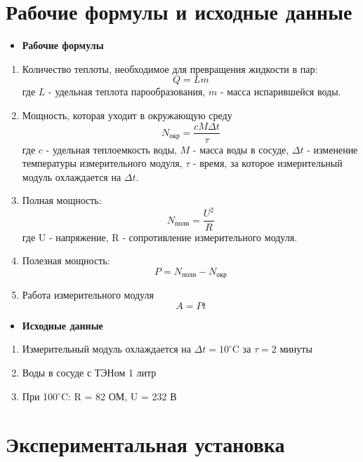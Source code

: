 \documentclass[a4paper]{article}
\begin{document}
\section{Рабочие формулы и исходные данные}
\begin{itemize}
    \item \textbf{Рабочие формулы}
\end{itemize}
\begin{enumerate}
    \item Количество теплоты, необходимое для превращения жидкости в пар:
        \[ Q = Lm \]
    где $L$ - удельная теплота парообразования, $m$ - масса испарившейся воды.

    \item Мощность, которая уходит в окружающую среду
        \[ N_{\text{окр}} = \frac{cM\Delta t}{\tau} \]
    где $c$ - удельная теплоемкость воды, $M$ - масса воды в сосуде, $\Delta t$ - изменение температуры измерительного модуля, $\tau$ - время, за которое измерительный модуль охлаждается на $\Delta t$.

\pagebreak


    \item Полная мощность:
        \[ N_{\text{полн}} = \frac{U^2}{R} \]
    где U - напряжение, R - сопротивление измерительного модуля.

    \item Полезная мощность:
        \[ P = N_{\text{полн}} - N_{\text{окр}} \]

    \item Работа измерительного модуля
        \[ A = Pt \]
\end{enumerate}

\begin{itemize}
    \item \textbf{Исходные данные}
\end{itemize}
\begin{enumerate}
    \item Измерительный модуль охлаждается на $\Delta t = 10^{\circ}$C за $\tau = 2$ минуты
    \item Воды в сосуде с ТЭНом 1 литр
    \item При 100$^{\circ}$C: R = 82 ОМ, U = 232 В
\end{enumerate}

\section{Экспериментальная установка}
\end{document}
